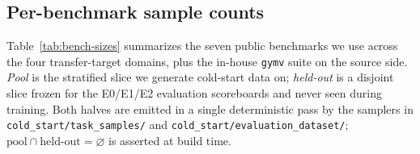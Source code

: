 \subsection{Per-benchmark sample counts}
\label{app:bench-sizes}

Table~\ref{tab:bench-sizes} summarizes the seven public benchmarks we
use across the four transfer-target domains, plus the in-house
\texttt{gymv} suite on the source side. \emph{Pool} is the stratified
slice we generate cold-start data on; \emph{held-out} is a disjoint
slice frozen for the E0/E1/E2 evaluation scoreboards and never seen
during training. Both halves are emitted in a single deterministic pass
by the samplers in \texttt{cold\_start/task\_samples/} and
\texttt{cold\_start/evaluation\_dataset/}; \mbox{$\text{pool}\cap
\text{held-out}=\varnothing$} is asserted at build time.

